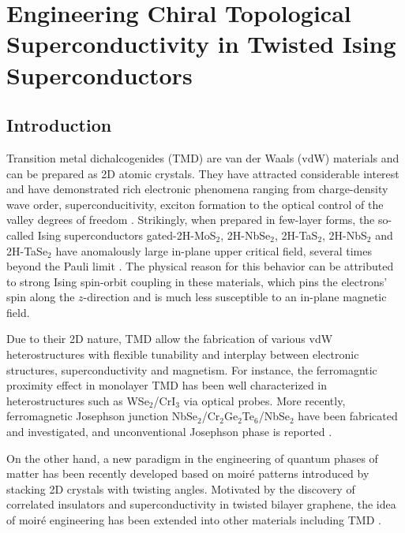 \chapter{Engineering Chiral Topological Superconductivity in Twisted Ising Superconductors}

\section{Introduction}
Transition metal dichalcogenides (TMD) are van der Waals (vdW) materials and can be prepared as 2D atomic crystals. They have attracted considerable interest and have demonstrated rich electronic phenomena ranging from charge-density wave order, superconducitivity, exciton formation to the optical control of the valley degrees of freedom \cite{lian2018unveiling,he2020valley,jones2013optical,rivera2016valley,li2021optical}. Strikingly, when prepared in few-layer forms, the so-called Ising superconductors gated-2H-MoS$_2$, 2H-NbSe$_2$, 2H-TaS$_2$, 2H-NbS$_2$ and 2H-TaSe$_2$ have anomalously large in-plane upper critical field, several times beyond the Pauli limit \cite{costanzo2016gate,yan2019thickness,Cho2021,de2018tuning,li2017superconducting,lian2019coexistence}. The physical reason for this behavior can be attributed to strong Ising spin-orbit coupling in these materials, which pins the electrons' spin along the $z$-direction and is much less susceptible to an in-plane magnetic field.

Due to their 2D nature, TMD allow the fabrication of various vdW heterostructures with flexible tunability and interplay between electronic structures, superconductivity and magnetism. For instance, the ferromagntic proximity effect in monolayer TMD has been well characterized in heterostructures such as WSe$_2$/CrI$_3$ \cite{cai2019atomically,aivazian2015magnetic,mcguire2017magnetic} via optical probes. More recently, ferromagnetic Josephson junction NbSe$_2$/Cr$_2$Ge$_2$Te$_6$/NbSe$_2$ have been fabricated and investigated, and unconventional Josephson phase is reported \cite{ai2021van,idzuchi2020van}.

On the other hand, a new paradigm in the engineering of quantum phases of matter has been recently developed based on moir\'{e} patterns \cite{cao2018correlated,cao2018unconventional,bistritzer2011moire} introduced by stacking 2D crystals with twisting angles. Motivated by the discovery of correlated insulators and superconductivity in twisted bilayer graphene, the idea of moir\'{e} engineering has been extended into other materials including TMD \cite{li2021imaging,devakul2021magic,angeli2021gamma,wu2019topological}.

